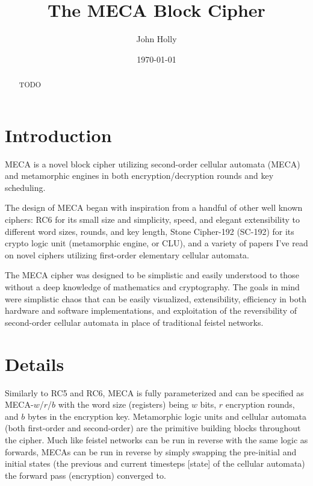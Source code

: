 \documentclass{article}
\title{\textbf{The MECA Block Cipher}}
\author{John Holly}
\date{\today}
\begin{document}
\maketitle

\newcommand{\Desc}[2]{\State \makebox[2em][l]{#1}#2}

\begin{abstract}
  \centering
  \begin{minipage}{\dimexpr\paperwidth-10cm}
    TODO
  \end{minipage}
\end{abstract}

\bigskip

\section{Introduction}

MECA is a novel block cipher utilizing second-order cellular automata (MECA) and metamorphic engines in both encryption/decryption rounds and key scheduling.

The design of MECA began with inspiration from a handful of other well known ciphers: RC6\cite{RC6} for its small size and simplicity, speed, and elegant extensibility to different word sizes, rounds, and key length, Stone Cipher-192 (SC-192)\cite{SC-192} for its crypto logic unit (metamorphic engine, or CLU), and a variety of papers I've read on novel ciphers utilizing first-order elementary cellular automata.

The MECA cipher was designed to be simplistic and easily understood to those without a deep knowledge of mathematics and cryptography. The goals in mind were simplistic chaos that can be easily visualized, extensibility, efficiency in both hardware and software implementations, and exploitation of the reversibility of second-order cellular automata in place of traditional feistel networks.

\section{Details}

Similarly to RC5 and RC6, MECA is fully parameterized and can be specified as MECA-$w$/$r$/$b$ with the word size (registers) being $w$ bits, $r$ encryption rounds, and $b$ bytes in the encryption key. Metamorphic logic units and cellular automata (both first-order and second-order) are the primitive building blocks throughout the cipher. Much like feistel networks can be run in reverse with the same logic as forwards, MECAs can be run in reverse by simply swapping the pre-initial and initial states (the previous and current timesteps [state] of the cellular automata) the forward pass (encryption) converged to.
\end{document}
